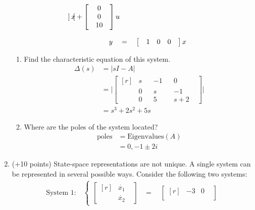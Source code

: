 \documentclass[11pt]{article}
\begin{document}
\begin{enumerate}
\begin{align}
\begin{bmatrix*}[r]
            \end{bmatrix*}
            x+
            \begin{bmatrix*}
            &0 &\\
            &0 &\\
            &10&
            \end{bmatrix*}
            u\\[0.75em]\notag
        y\quad&=\quad
        \begin{bmatrix}
            &1 & 0 & 0&\\
        \end{bmatrix}
        x
    \end{align}
    \begin{enumerate}
        \item Find the characteristic equation of this system.
        \begin{align*}
            \Delta(s)&=|sI-A|\\
            &=
            \Bigg|\begin{bmatrix*}[r]
                &s &&-1 &&0&\\
                &0 &&s &&-1&\\
                &0 &&5 &&s+2&
            \end{bmatrix*}\Bigg|\\
            &=s^3+2s^2+5s
        \end{align*}
        \item Where are the poles of the system located?
        \begin{align*}
            \text{poles}&=\text{Eigenvalues}(A)\\&=0,-1\pm 2i
        \end{align*}
    \end{enumerate}
    \item (+10 points) State-space representations are not unique. A single system can be represented in several possible ways. Consider the following two systems:
    \begin{align*}
        \text{System 1:}\quad
        \begin{cases}
            \begin{bmatrix*}[r]
                &\dot{x_1}&\\
                &\dot{x_2}&
            \end{bmatrix*}
            &=\quad
            \begin{bmatrix*}[r]
                &-3 & 0&\\

\end{bmatrix*}
\end{cases}
\end{align*}
\end{enumerate}
\end{document}
